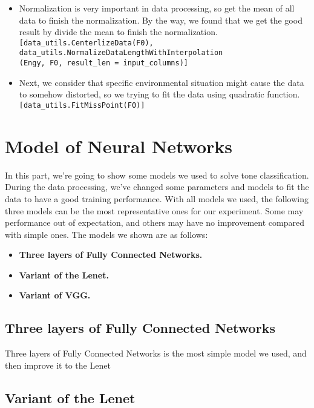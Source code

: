 \documentclass[12pt]{article}
\begin{document}
\begin{itemize}
\begin{itemize}
	\end{itemize}
	\item Normalization is very important in data processing, so get the mean of all data to finish the normalization. By the way, we found that we get the good result by divide the mean to finish the normalization.\\
	\texttt{[data\_utils.CenterlizeData(F0),\\
	data\_utils.NormalizeDataLengthWithInterpolation\\
	(Engy, F0, result\_len = input\_columns)]}
	
	\item Next, we consider that specific environmental situation might cause the data to somehow distorted, so we trying to fit the data using quadratic function.\\
	\texttt{[data\_utils.FitMissPoint(F0)]}
\end{itemize}

\section{Model of Neural Networks}
In this part, we're going to show some models we used to solve tone classification. During the data processing, we've changed some parameters and models to fit the data to have a good training performance. With all models we used, the following three models can be the most representative ones for our experiment. Some may performance out of expectation, and others may have no improvement compared with simple ones. The models we shown are as follows:
\begin{itemize}
	\item {\bf Three layers of Fully Connected Networks.}
	\item {\bf Variant of the Lenet.}
	\item {\bf Variant of VGG.}
\end{itemize}

\subsection{Three layers of Fully Connected Networks}
Three layers of Fully Connected Networks is the most simple model we used, and then improve it to the Lenet


\subsection{Variant of the Lenet}
\end{document}
